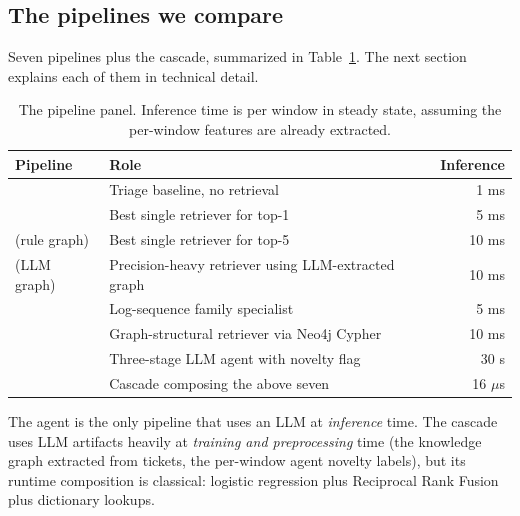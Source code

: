 \subsection{The pipelines we compare}

Seven pipelines plus the cascade, summarized in Table~\ref{tab:pipeline-panel}. The next section explains each of them in technical detail.

\begin{table}[h]
\centering
\caption{The pipeline panel. Inference time is per window in steady state, assuming the per-window features are already extracted.}
\label{tab:pipeline-panel}
\small
\begin{tabularx}{\linewidth}{l X r}
\toprule
Pipeline & Role & Inference \\
\midrule
\hgb{} & Triage baseline, no retrieval & 1 ms \\
\bienc{} & Best single retriever for top-1 & 5 ms \\
\hrrf{} (rule graph) & Best single retriever for top-5 & 10 ms \\
\hrrf{} (LLM graph) & Precision-heavy retriever using LLM-extracted graph & 10 ms \\
\logseq{} & Log-sequence family specialist & 5 ms \\
\kgret{} & Graph-structural retriever via Neo4j Cypher & 10 ms \\
\agent{} & Three-stage LLM agent with novelty flag & 30 s \\
\midrule
\tch{} & Cascade composing the above seven & 16 $\mu$s \\
\bottomrule
\end{tabularx}
\end{table}

The agent is the only pipeline that uses an LLM at \emph{inference} time. The cascade uses LLM artifacts heavily at \emph{training and preprocessing} time (the knowledge graph extracted from tickets, the per-window agent novelty labels), but its runtime composition is classical: logistic regression plus Reciprocal Rank Fusion plus dictionary lookups.
